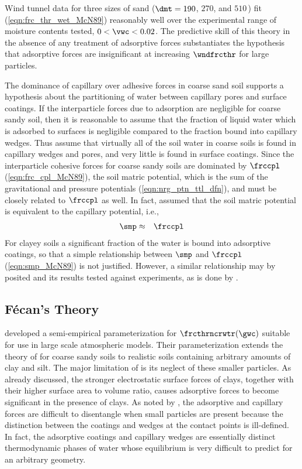 \documentclass[12pt,twoside]{book}
\begin{document}
Wind tunnel data for three sizes of sand ($\dmt = 190$, $270$, and
$510$\,\um) fit (\ref{eqn:frc_thr_wet_McN89}) reasonably well over the
experimental range of moisture contents tested, $0 < \vwc < 0.02$.
The predictive skill of this theory in the absence of any treatment of
adsorptive forces substantiates the hypothesis that adsorptive forces
are insignificant at increasing $\wndfrcthr$ for large particles.

The dominance of capillary over adhesive forces in coarse sand soil
supports a hypothesis about the partitioning of water between
capillary pores and surface coatings.
If the interparticle forces due to adsorption are negligible for
coarse sandy soil, then it is reasonable to assume that the fraction
of liquid water which is adsorbed to surfaces is negligible compared
to the fraction bound into capillary wedges.
Thus \cite{McN89} assume that virtually all of the soil water in
coarse soils is found in capillary wedges and pores, and very little
is found in surface coatings.
Since the interparticle cohesive forces for coarse sandy soils are
dominated by $\frccpl$ (\ref{eqn:frc_cpl_McN89}), the soil matric
potential, which is the sum of the gravitational and pressure
potentials (\ref{eqn:nrg_ptn_ttl_dfn}), and must be closely related to  
$\frccpl$ as well.
In fact, \cite{McN89} assumed that the soil matric potential is
equivalent to the capillary potential, i.e., 
\begin{eqnarray}
\smp & \approx & \frccpl
\label{eqn:smp_McN89}
\end{eqnarray}
For clayey soils a significant fraction of the water is bound into
adsorptive coatings, so that a simple relationship between $\smp$ and 
$\frccpl$ (\ref{eqn:smp_McN89}) is not justified.
However, a similar relationship may by posited and its results tested
against experiments, as is done by \cite{FMB99}.

\subsection[F\'{e}can's Theory]{F\'{e}can's Theory}\label{sxn:FMB99}
\cite{FMB99} developed a semi-empirical parameterization for 
$\frcthrncrwtr(\gwc)$ suitable for use in large scale atmospheric
models. 
Their parameterization extends the theory of \cite{McN89} for coarse
sandy soils to realistic soils containing arbitrary amounts of clay
and silt.
The major limitation of \cite{McN89} is its neglect of these smaller
particles.
As already discussed, the stronger electrostatic surface forces of
clays, together with their higher surface area to volume ratio, causes
adsorptive forces to become significant in the presence of clays.
As noted by \cite{Hil82}, the adsorptive and capillary forces are
difficult to disentangle when small particles are present because the
distinction between the coatings and wedges at the contact points is
ill-defined. 
In fact, the adsorptive coatings and capillary wedges are essentially
distinct thermodynamic phases of water whose equilibrium is very
difficult to predict for an arbitrary geometry.
\end{document}

